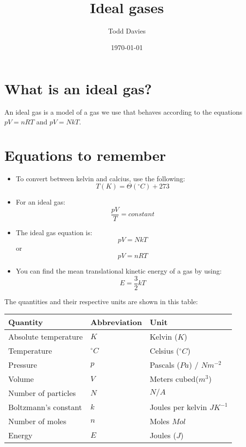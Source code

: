 \documentclass{article}
\title{Ideal gases}
\author{Todd Davies}
\date{\today}
\begin{document}
\lhead{\today}

\maketitle

\section*{What is an ideal gas?}
\thispagestyle{empty}
An ideal gas is a model of a gas we use that behaves according to the equations $pV = nRT$ and $pV = NkT$.

\section*{Equations to remember}
\begin{itemize}
	\item To convert between kelvin and calcius, use the following:
	\[
		T(K) = \Theta(^\circ C) + 273
	\]
	\item For an ideal gas:
	\[
		\frac{pV}{T} = constant
	\]
	\item The ideal gas equation is:
	\[
		pV = NkT
	\]
	or
	\[
		pV = nRT
	\]
	\item You can find the mean translational kinetic energy of a gas by using:
	\[
		E = \frac{3}{2}kT
	\]
	\end{itemize}

The quantities and their respective units are shown in this table:

\begin{center}
	\begin{tabular}{|l|l|l|}
		\hline
			Quantity & Abbreviation & Unit \\ \hline
			Absolute temperature & $K$ & Kelvin ($K$) \\ \hline
			Temperature & $^\circ C$ & Celsius ($^\circ C$) \\ \hline
			Pressure & $p$ & Pascals ($Pa$) / $Nm^{-2}$ \\ \hline
			Volume & $V$ & Meters cubed($m^3$)\\ \hline
			Number of particles & $N$ & $N/A$\\ \hline
			Boltzmann's constant & $k$ & Joules per kelvin $JK^{-1}$\\ \hline
			Number of moles & $n$ & Moles $Mol$\\ \hline
			Energy & $E$ & Joules ($J$)\\ \hline
	\end{tabular}
\end{center}
\end{document}
